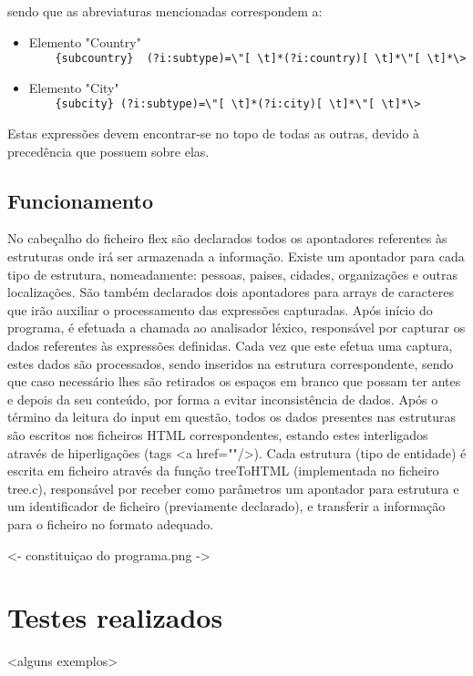 sendo que as abreviaturas mencionadas correspondem a:

\begin{itemize}
\item Elemento "Country"\\
	 \verb!    {subcountry}  (?i:subtype)=\"[ \t]*(?i:country)[ \t]*\"[ \t]*\>!
\item Elemento "City"\\
	 \verb!    {subcity} (?i:subtype)=\"[ \t]*(?i:city)[ \t]*\"[ \t]*\>!
     
\end{itemize}

Estas expressões devem encontrar-se no topo de todas as outras, devido à precedência que possuem sobre elas.

\subsection{Funcionamento}
\label{seq:enamex-func}

No cabeçalho do ficheiro flex são declarados todos os apontadores referentes às estruturas onde irá ser armazenada a informação. Existe um apontador para cada tipo de estrutura, nomeadamente: pessoas, paises, cidades, organizações e outras localizações. São também declarados dois apontadores para arrays de caracteres que irão auxiliar o processamento das expressões capturadas. Após início do programa, é efetuada a chamada ao analisador léxico, responsável por capturar os dados referentes às expressões definidas. Cada vez que este efetua uma captura, estes dados são processados, sendo inseridos na estrutura correspondente, sendo que caso necessário lhes são retirados os espaços em branco que possam ter antes e depois da seu conteúdo, por forma a evitar inconsistência de dados. Após o término da leitura do input em questão, todos os dados presentes nas estruturas são escritos nos ficheiros HTML correspondentes, estando estes interligados através de hiperligações (tags <a href=""/>). Cada estrutura (tipo de entidade) é escrita em ficheiro através da função treeToHTML (implementada no ficheiro tree.c), responsável por receber como parâmetros um apontador para estrutura e um identificador de ficheiro (previamente declarado), e transferir a informação para o ficheiro no formato adequado.


<- constituiçao do programa.png ->

\section{Testes realizados}
\label{seq:enamex-test}
<alguns exemplos>


